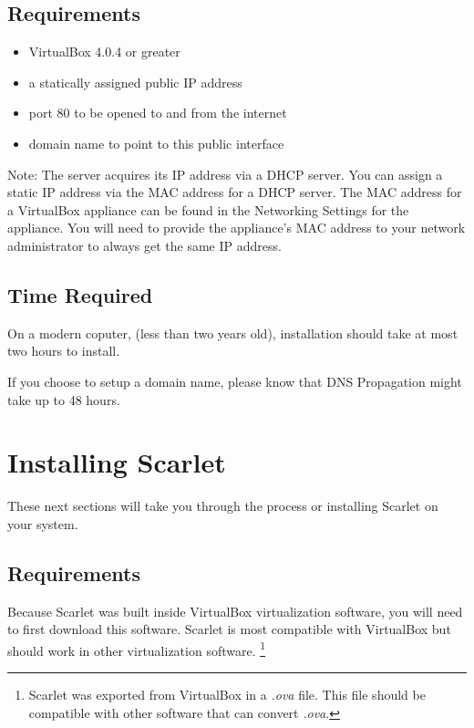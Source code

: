 \documentclass[pdftex,11pt,letterpaper]{article}
\begin{document}
\subsection{Requirements}

\begin{itemize}
\item VirtualBox 4.0.4 or greater
\item a statically assigned public IP address 
\item port 80 to be opened to and from the internet
\item domain name to point to this public interface
\end{itemize}

Note:
The server acquires its IP address via a DHCP server.  You can assign a static IP address via the MAC address for a DHCP server.  The MAC address for a VirtualBox appliance can be found in the Networking Settings for the appliance. You will need to provide the appliance's MAC address to your network administrator to always get the same IP address.

\subsection{Time Required}

On a modern coputer, (less than two years old), installation should take at most two hours to install.

If you choose to setup a domain name, please know that DNS Propagation might take up to 48 hours.

\section{Installing Scarlet}

These next sections will take you through the process or installing Scarlet on your system.

\subsection{Requirements}

Because Scarlet was built inside VirtualBox virtualization software, you will need to first download this software.  Scarlet is most compatible with VirtualBox but should work in other virtualization software.
\footnote{Scarlet was exported from VirtualBox in a \textit{.ova} file.  This file should be compatible with other software that can convert \textit{.ova}.}
\end{document}
